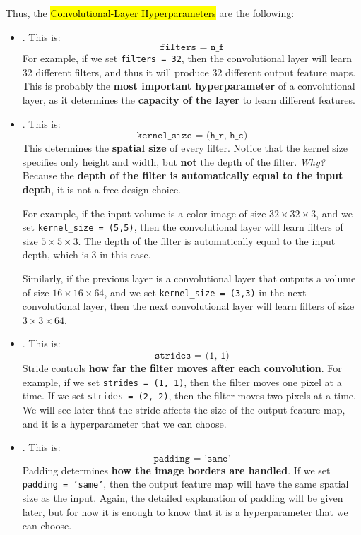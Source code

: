 \highspace
Thus, the \hl{Convolutional-Layer Hyperparameters} are the following:
\begin{itemize}
    \item {}. This is:
    \begin{equation*}
        \texttt{filters = n\_f}
    \end{equation*}
    For example, if we set \texttt{filters = 32}, then the convolutional layer will learn 32 different filters, and thus it will produce 32 different output feature maps. This is probably the \textbf{most important hyperparameter} of a convolutional layer, as it determines the \textbf{capacity of the layer} to learn different features.


    \item {}. This is:
    \begin{equation*}
        \texttt{kernel\_size = (h\_r, h\_c)}
    \end{equation*}
    This determines the \textbf{spatial size} of every filter. Notice that the kernel size specifies only height and width, but \textbf{not} the depth of the filter. \emph{Why?} Because the \textbf{depth of the filter is automatically equal to the input depth}, it is not a free design choice.

    \highspace
    For example, if the input volume is a color image of size $32 \times 32 \times 3$, and we set \texttt{kernel\_size = (5,5)}, then the convolutional layer will learn filters of size $5 \times 5 \times 3$. The depth of the filter is automatically equal to the input depth, which is 3 in this case.

    Similarly, if the previous layer is a convolutional layer that outputs a volume of size $16 \times 16 \times 64$, and we set \texttt{kernel\_size = (3,3)} in the next convolutional layer, then the next convolutional layer will learn filters of size $3 \times 3 \times 64$.


    \item {}. This is:
    \begin{equation*}
        \texttt{strides = (1, 1)}
    \end{equation*}
    Stride controls \textbf{how far the filter moves after each convolution}. For example, if we set \texttt{strides = (1, 1)}, then the filter moves one pixel at a time. If we set \texttt{strides = (2, 2)}, then the filter moves two pixels at a time. We will see later that the stride affects the size of the output feature map, and it is a hyperparameter that we can choose.


    \item {}. This is:
    \begin{equation*}
        \texttt{padding = 'same'}
    \end{equation*}
    Padding determines \textbf{how the image borders are handled}. If we set \texttt{padding = 'same'}, then the output feature map will have the same spatial size as the input. Again, the detailed explanation of padding will be given later, but for now it is enough to know that it is a hyperparameter that we can choose.
\end{itemize}
